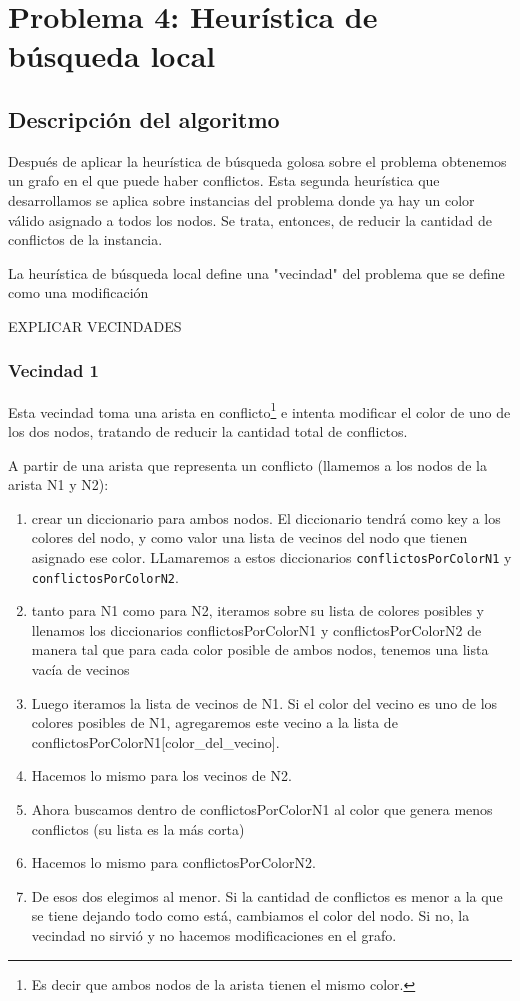 \section{Problema 4: Heurística de búsqueda local}

\subsection{Descripción del algoritmo}

Después de aplicar la heurística de búsqueda golosa sobre el problema obtenemos un grafo en el que puede haber conflictos. Esta segunda heurística que desarrollamos se aplica sobre instancias del problema donde ya hay un color válido asignado a todos los nodos. Se trata, entonces, de reducir la cantidad de conflictos de la instancia.

La heurística de búsqueda local define una "vecindad" del problema que se define como una modificación 

EXPLICAR VECINDADES

\subsubsection{Vecindad 1}

Esta vecindad toma una arista en conflicto\footnote{Es decir que ambos nodos de la arista tienen el mismo color.} e intenta modificar el color de uno de los dos nodos, tratando de reducir la cantidad total de conflictos.

A partir de una arista que representa un conflicto (llamemos a los nodos de la arista N1 y N2):
\begin{enumerate}
 \item crear un diccionario para ambos nodos. El diccionario tendrá como key a los colores del nodo, y como valor una lista de vecinos del nodo que tienen asignado ese color. LLamaremos a estos diccionarios \texttt{conflictosPorColorN1} y \texttt{conflictosPorColorN2}.
 \item tanto para N1 como para N2, iteramos sobre su lista de colores posibles y llenamos los diccionarios conflictosPorColorN1 y conflictosPorColorN2 de manera tal que para cada color posible de ambos nodos, tenemos una lista vacía de vecinos
 \item Luego iteramos la lista de vecinos de N1. Si el color del vecino es uno de los colores posibles de N1, agregaremos este vecino a la lista de conflictosPorColorN1[color_del_vecino].
 \item Hacemos lo mismo para los vecinos de N2.
 \item Ahora buscamos dentro de conflictosPorColorN1 al color que genera menos conflictos (su lista es la más corta)
 \item Hacemos lo mismo para conflictosPorColorN2.
 \item De esos dos elegimos al menor. Si la cantidad de conflictos es menor a la que se tiene dejando todo como está, cambiamos el color del nodo. Si no, la vecindad no sirvió y no hacemos modificaciones en el grafo.
\end{enumerate}



